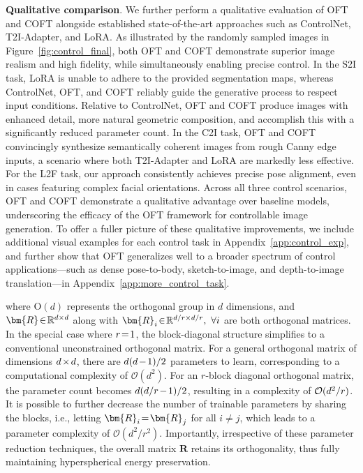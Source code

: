 \begin{itemize}[leftmargin=*,nosep]
\begin{itemize}[leftmargin=*,nosep]
\textbf{Qualitative comparison}. We further perform a qualitative evaluation of OFT and COFT alongside established state-of-the-art approaches such as ControlNet, T2I-Adapter, and LoRA. As illustrated by the randomly sampled images in Figure~\ref{fig:control_final}, both OFT and COFT demonstrate superior image realism and high fidelity, while simultaneously enabling precise control. In the S2I task, LoRA is unable to adhere to the provided segmentation maps, whereas ControlNet, OFT, and COFT reliably guide the generative process to respect input conditions. Relative to ControlNet, OFT and COFT produce images with enhanced detail, more natural geometric composition, and accomplish this with a significantly reduced parameter count. In the C2I task, OFT and COFT convincingly synthesize semantically coherent images from rough Canny edge inputs, a scenario where both T2I-Adapter and LoRA are markedly less effective. For the L2F task, our approach consistently achieves precise pose alignment, even in cases featuring complex facial orientations. Across all three control scenarios, OFT and COFT demonstrate a qualitative advantage over baseline models, underscoring the efficacy of the OFT framework for controllable image generation. To offer a fuller picture of these qualitative improvements, we include additional visual examples for each control task in Appendix~\ref{app:control_exp}, and further show that OFT generalizes well to a broader spectrum of control applications—such as dense pose-to-body, sketch-to-image, and depth-to-image translation—in Appendix~\ref{app:more_control_task}.

where $\text{O}(d)$ represents the orthogonal group in $d$ dimensions, and $\thickmuskip=2mu \medmuskip=2mu \bm{R} \in \mathbb{R}^{d\times d}$ along with $\thickmuskip=2mu \medmuskip=2mu \bm{R}_i \in \mathbb{R}^{d/r\times d/r},~\forall i$ are both orthogonal matrices. In the special case where $\thickmuskip=2mu \medmuskip=2mu r=1$, the block-diagonal structure simplifies to a conventional unconstrained orthogonal matrix. For a general orthogonal matrix of dimensions $\thickmuskip=2mu \medmuskip=2mu d\times d$, there are $\thickmuskip=2mu \medmuskip=2mu d(d-1)/2$ parameters to learn, corresponding to a computational complexity of $\mathcal{O}(d^2)$. For an $r$-block diagonal orthogonal matrix, the parameter count becomes $\thickmuskip=2mu \medmuskip=2mu d(d/r-1)/2$, resulting in a complexity of $\thickmuskip=2mu \medmuskip=2mu \mathcal{O}(d^2/r)$. It is possible to further decrease the number of trainable parameters by sharing the blocks, i.e., letting $\thickmuskip=2mu \medmuskip=2mu \bm{R}_i = \bm{R}_j$ for all $i\neq j$, which leads to a parameter complexity of $\mathcal{O}(d^2/r^2)$. Importantly, irrespective of these parameter reduction techniques, the overall matrix $\bm{R}$ retains its orthogonality, thus fully maintaining hyperspherical energy preservation.


\end{itemize}
\end{itemize}
